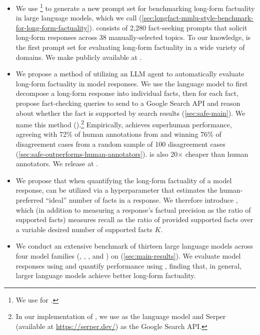\documentclass{article}
\theoremstyle{plain}
\theoremstyle{definition}
\theoremstyle{remark}
\begin{document}
\vspace{-2mm}
\begin{itemize}[leftmargin=3mm,noitemsep]
\item We use \gptfour{}\footnote{We use \gptfourfull{} for \gptfour{}.} to generate a new prompt set for benchmarking long-form factuality in large language models, which we call \textit{\longfact{}} (\cref{sec:longfact-mmlu-style-benchmark-for-long-form-factuality}).
\longfact{} consists of 2,280 fact-seeking prompts that solicit long-form responses across 38 manually-selected topics.
To our knowledge, \longfact{} is the first prompt set for evaluating long-form factuality in a wide variety of domains. 
We make \longfact{} publicly available at \longfacturl{}.

\item We propose a method of utilizing an LLM agent to automatically evaluate long-form factuality in model responses.
We use the language model to first decompose a long-form response into individual facts, then for each fact, propose fact-checking queries to send to a Google Search API and reason about whether the fact is supported by search results (\cref{sec:safe-main}).
We name this method \safe{} (\safelong{}).\footnote{In our implementation of \safe{}, we use \chatgptfull{} as the language model and Serper (available at \url{https://serper.dev/}) as the Google Search API.}
Empirically, \safe{} achieves superhuman performance, agreeing with 72\% of human annotations from \citet{min2023factscore} and winning 76\% of disagreement cases from a random sample of 100 disagreement cases (\cref{sec:safe-outperforms-human-annotators}).
\safe{} is also 20$\times$ cheaper than human annotators.
We release \safe{} at \safeurl{}.

\item We propose that when quantifying the long-form factuality of a model response, \metricshort{} can be utilized via a hyperparameter that estimates the human-preferred ``ideal'' number of facts in a response.
We therefore introduce \metric{}, which (in addition to measuring a response's factual precision as the ratio of supported facts) measures recall as the ratio of provided supported facts over a variable desired number of supported facts $K$.

\item We conduct an extensive benchmark of thirteen large language models across four model families (\gemini{}, \gpt{}, \claude{}, and \ulm{}) on \longfact{} (\cref{sec:main-results}).
We evaluate model responses using \safe{} and quantify performance using \metric{}, finding that, in general, larger language models achieve better long-form factuality.
\end{itemize}
\end{document}
